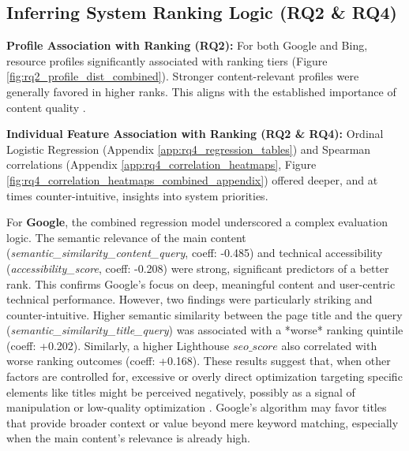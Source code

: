 \documentclass[a4paper,fleqn]{cas-sc}
\newcommand{\longvar}[1]{\textit{#1}}
\begin{document}
\subsection{Inferring System Ranking Logic (RQ2 \& RQ4)}
\label{subsec:discussion_rq2_rq4}
\textbf{Profile Association with Ranking (RQ2):} For both Google and Bing, resource profiles significantly associated with ranking tiers (Figure \ref{fig:rq2_profile_dist_combined}). Stronger content-relevant profiles were generally favored in higher ranks. This aligns with the established importance of content quality \citep{Srinivas2025}.

\textbf{Individual Feature Association with Ranking (RQ2 \& RQ4):} Ordinal Logistic Regression (Appendix \ref{app:rq4_regression_tables}) and Spearman correlations (Appendix \ref{app:rq4_correlation_heatmaps}, Figure \ref{fig:rq4_correlation_heatmaps_combined_appendix}) offered deeper, and at times counter-intuitive, insights into system priorities.

For \textbf{Google}, the combined regression model underscored a complex evaluation logic. The semantic relevance of the main content (\longvar{semantic_similarity_content_query}, coeff: -0.485) and technical accessibility (\longvar{accessibility_score}, coeff: -0.208) were strong, significant predictors of a better rank. This confirms Google's focus on deep, meaningful content and user-centric technical performance. However, two findings were particularly striking and counter-intuitive. Higher semantic similarity between the page title and the query (\longvar{semantic_similarity_title_query}) was associated with a *worse* ranking quintile (coeff: +0.202). Similarly, a higher Lighthouse $seo\_score$ also correlated with worse ranking outcomes (coeff: +0.168). These results suggest that, when other factors are controlled for, excessive or overly direct optimization targeting specific elements like titles might be perceived negatively, possibly as a signal of manipulation or low-quality optimization \citep{Nagpal2021}. Google's algorithm may favor titles that provide broader context or value beyond mere keyword matching, especially when the main content's relevance is already high.
\end{document}
